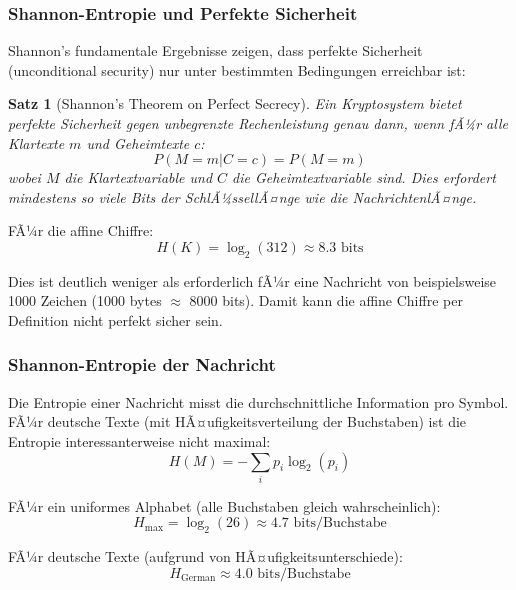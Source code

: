 ﻿\documentclass[12pt,a4paper]{article}
\newtheorem{theorem}{Satz}
\begin{document}
	\subsubsection{Shannon-Entropie und Perfekte Sicherheit}
	
	Shannon's fundamentale Ergebnisse zeigen, dass perfekte Sicherheit (unconditional security) nur unter bestimmten Bedingungen erreichbar ist:
	
	\begin{theorem}[Shannon's Theorem on Perfect Secrecy]
		Ein Kryptosystem bietet perfekte Sicherheit gegen unbegrenzte Rechenleistung genau dann, wenn fÃ¼r alle Klartexte $m$ und Geheimtexte $c$:
		\begin{equation}
			P(M = m | C = c) = P(M = m)
		\end{equation}
		wobei $M$ die Klartextvariable und $C$ die Geheimtextvariable sind. Dies erfordert mindestens so viele Bits der SchlÃ¼ssellÃ¤nge wie die NachrichtenlÃ¤nge.
	\end{theorem}
	
	FÃ¼r die affine Chiffre:
	\begin{equation}
		H(K) = \log_2(312) \approx 8.3 \text{ bits}
	\end{equation}
	
	Dies ist deutlich weniger als erforderlich fÃ¼r eine Nachricht von beispielsweise 1000 Zeichen (1000 bytes $\approx$ 8000 bits). Damit kann die affine Chiffre per Definition nicht perfekt sicher sein.
	
	\subsubsection{Shannon-Entropie der Nachricht}
	
	Die Entropie einer Nachricht misst die durchschnittliche Information pro Symbol. FÃ¼r deutsche Texte (mit HÃ¤ufigkeitsverteilung der Buchstaben) ist die Entropie interessanterweise nicht maximal:
	\begin{equation}
		H(M) = -\sum_{i} p_i \log_2(p_i)
	\end{equation}
	
	FÃ¼r ein uniformes Alphabet (alle Buchstaben gleich wahrscheinlich):
	\begin{equation}
		H_{\max} = \log_2(26) \approx 4.7 \text{ bits/Buchstabe}
	\end{equation}
	
	FÃ¼r deutsche Texte (aufgrund von HÃ¤ufigkeitsunterschiede):
	\begin{equation}
		H_{\text{German}} \approx 4.0 \text{ bits/Buchstabe}
	\end{equation}
	
\end{document}
